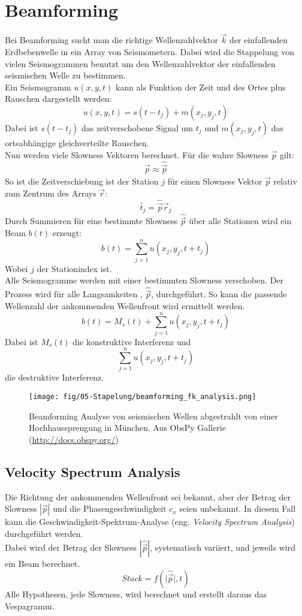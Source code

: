 \section{Beamforming}
Bei Beamforming sucht man die richtige Wellenzahlvektor $\vec{k}$ der einfallenden Erdbebenwelle in ein Array von Seismometern. Dabei wird die Stappelung von vielen Seismogrammen benutzt um den Wellenzahlvektor der einfallenden seismischen Welle zu bestimmen.\\
Ein Seismogramm $u(x,y,t)$ kann als Funktion der Zeit und des Ortes plus Rauschen dargestellt werden:
\begin{equation}
u(x,y,t) = s(t-t_{j})+m(x_{j},y_{j},t)
\end{equation}
Dabei ist $s(t-t_{j})$ das zeitverschobene Signal um $t_j$ und $m(x_{j},y_{j},t)$ das ortsabhängige gleichverteilte Rauschen.\\
Nun werden viele Slowness Vektoren berechnet. Für die wahre Slowness $\vec{p}$ gilt: 
\[
\vec{p} \approx \hat{\vec{p}}
\]
So ist die Zeitverschiebung ist der Station $j$ für einen Slowness Vektor $\hat{\vec{p}}$ relativ zum Zentrum des Arrays $\vec{r}$:
\begin{equation}
\hat{t}_{j}=\hat{\vec{p}} \vec{r}_j
\end{equation}
Durch Summieren für eine bestimmte Slowness $\hat{\vec{p}}$ über alle Stationen wird ein Beam $b(t)$ erzeugt:
\begin{equation}
 b(t) = \sum_{j=1}^{n} u( x_j,y_j,t+t_j)
\end{equation}
Wobei $j$ der Stationindex ist.\\
Alle Seismogramme werden mit einer bestimmten Slowness verschoben. Der Prozess wird für alle Langsamkeiten , $\hat{\vec{p}}$, durchgeführt. So kann die passende Wellenzahl der ankommenden Wellenfront wird ermittelt werden.
\begin{equation}
b(t) = M_s(t)+ \sum_{j=1}^n u( x_j,y_j,t+t_j)
\end{equation}
Dabei ist $M_s(t)$ die konstruktive Interferenz und
\[
\sum_{j=1}^n u( x_j,y_j,t+t_j)
\]
die destruktive Interferenz.
\begin{figure}[h!]
\centering
\texttt{[image: fig/05-Stapelung/beamforming\_fk\_analysis.png]}
\caption{Beamforming Analyse von seismischen Wellen abgestrahlt von einer Hochhaussprengung in München. Aus ObsPy Gallerie (\url{http://docs.obspy.org/})}
\end{figure}

\subsection{Velocity Spectrum Analysis}
Die Richtung der ankommenden Wellenfront sei bekannt, aber der Betrag der Slowness  $|\vec{p}|$ und die Phasengeschwindigkeit $c_x$ seien unbekannt.
In diesem Fall kann die Geschwindigkeit-Spektrum-Analyse (eng. \textsl{Velocity Spectrum Analysis}) durchgeführt werden.\\
Dabei wird der Betrag der Slowness $|\hat{\vec{p}}|$, systematisch variiert, und jeweils wird ein Beam berechnet.
\[
Stack = f(\vert\hat{\vec{p}}\vert,t)
\]
Alle Hypothesen, jede Slowness, wird berechnet und erstellt daraus das Vespagramm.

